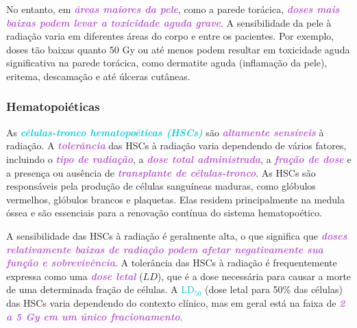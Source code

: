 \documentclass[11pt,a4paper]{article}
\newcounter{exemplo}
\begin{document}
	No entanto, em \textcolor{MediumOrchid}{\textbf{\textit{áreas maiores da pele}}}, como a parede torácica, \textcolor{MediumOrchid}{\textbf{\textit{doses mais baixas podem levar a toxicidade aguda grave}}}. A sensibilidade da pele à radiação varia em diferentes áreas do corpo e entre os pacientes. Por exemplo, doses tão baixas quanto 50 Gy ou até menos podem resultar em toxicidade aguda significativa na parede torácica, como dermatite aguda (inflamação da pele), eritema, descamação e até úlceras cutâneas.

\subsubsection*{Hematopoiéticas}

	As \textcolor{DarkTurquoise}{\textbf{\textit{células-tronco hematopoéticas (HSCs)}}} são \textcolor{MediumOrchid}{\textbf{\textit{altamente sensíveis}}} à radiação. A \textcolor{MediumOrchid}{\textbf{\textit{tolerância}}} das HSCs à radiação varia dependendo de vários fatores, incluindo o \textcolor{MediumOrchid}{\textbf{\textit{tipo de radiação}}}, a \textcolor{MediumOrchid}{\textbf{\textit{dose total administrada}}}, a \textcolor{MediumOrchid}{\textbf{\textit{fração de dose}}} e a presença ou ausência de \textcolor{MediumOrchid}{\textbf{\textit{transplante de células-tronco}}}.	As HSCs são responsáveis pela produção de células sanguíneas maduras, como glóbulos vermelhos, glóbulos brancos e plaquetas. Elas residem principalmente na medula óssea e são essenciais para a renovação contínua do sistema hematopoético.

	A sensibilidade das HSCs à radiação é geralmente alta, o que significa que \textcolor{MediumOrchid}{\textbf{\textit{doses relativamente baixas de radiação podem afetar negativamente sua função e sobrevivência}}}. A tolerância das HSCs à radiação é frequentemente expressa como uma \textcolor{MediumOrchid}{\textbf{\textit{dose letal}}} ($LD$), que é a dose necessária para causar a morte de uma determinada fração de células. A \textcolor{DarkTurquoise}{\textbf{\textit{$\text{LD}_{50}$}}} (dose letal para 50\% das células) das HSCs varia dependendo do contexto clínico, mas em geral está na faixa de \textcolor{MediumOrchid}{\textbf{\textit{2 a 5 Gy em um único fracionamento}}}.
\end{document}
